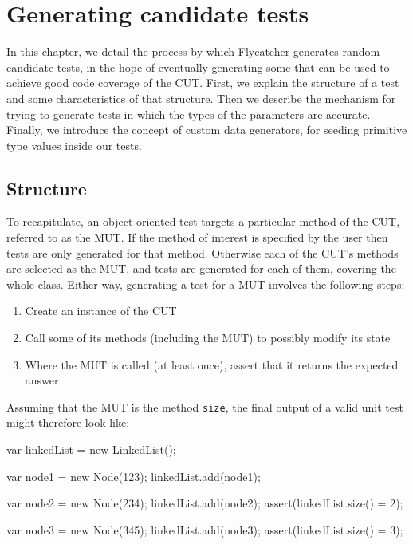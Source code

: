\chapter{Generating candidate tests}
\label{randomtest}
In this chapter, we detail the process by which \textsf{Flycatcher} generates random candidate tests, in the hope of eventually generating some that can be used to achieve good code coverage of the CUT. First, we explain the structure of a test and some characteristics of that structure. Then we describe the mechanism for trying to generate tests in which the types of the parameters are accurate. Finally, we introduce the concept of custom data generators, for seeding primitive type values inside our tests.


\section{Structure}

To recapitulate, an object-oriented test targets a particular method of the CUT, referred to as the MUT. If the method of interest is specified by the user then tests are only generated for that method. Otherwise each of the CUT's methods are selected as the MUT, and tests are generated for each of them, covering the whole class. Either way, generating a test for a MUT involves the following steps:

\begin{enumerate}
	\item Create an instance of the CUT
	\item Call some of its methods (including the MUT) to possibly modify its state
	\item Where the MUT is called (at least once), assert that it returns the expected answer
\end{enumerate}

Assuming that the MUT is the method \texttt{size}, the final output of a valid unit test might therefore look like:

\begin{code}[caption=Output format,label=final]
var linkedList = new LinkedList();

var node1 = new Node(123);
linkedList.add(node1);

var node2 = new Node(234);
linkedList.add(node2);
assert(linkedList.size() = 2);

var node3 = new Node(345);
linkedList.add(node3);
assert(linkedList.size() = 3);
\end{code}

